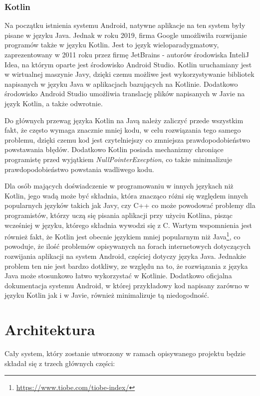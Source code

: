 \documentclass[a4paper,12pt,twoside,openany]{report}
\begin{document}
\subsection{Kotlin}
Na początku istnienia systemu Android, natywne aplikacje na ten system były pisane w języku Java. Jednak w roku 2019, firma Google umożliwiła rozwijanie programów także w języku Kotlin. Jest to język wieloparadygmatowy, zaprezentowany w 2011 roku przez firmę JetBrains - autorów środowiska InteliJ Idea, na którym oparte jest środowisko Android Studio. Kotlin uruchamiany jest w wirtualnej maszynie Javy, dzięki czemu możliwe jest wykorzystywanie bibliotek napisanych w języku Java w aplikacjach bazujących na Kotlinie. Dodatkowo środowisko Android Studio umożliwia translację plików napisanych w Javie na język Kotlin, a także odwrotnie. 

Do głównych przewag języka Kotlin na Javą należy zaliczyć przede wszystkim fakt, że często wymaga znacznie mniej kodu, w celu rozwiązania tego samego problemu, dzięki czemu kod jest czytelniejszy co zmniejsza prawdopodobieństwo powstawania błędów. Dodatkowo Kotlin posiada mechanizmy chroniące programistę przed wyjątkiem \textit{NullPointerExecption}, co także minimalizuje prawdopodobieństwo powstania wadliwego kodu. 

Dla osób mających doświadczenie w programowaniu w innych językach niż Kotlin, jego wadą może być składnia, która znacząco różni się względem innych popularnych języków takich jak Javy, czy C++ co może powodować problemy dla programistów, którzy uczą się pisania aplikacji przy użyciu  Kotlina, pisząc wcześniej w języku, którego składnia wywodzi się z C. Wartym wspomnienia jest również fakt, że Kotlin jest obecnie językiem mniej popularnym niż Java\footnote{\url{https://www.tiobe.com/tiobe-index/}}, co powoduje, że ilość problemów opisywanych na forach internetowych dotyczących rozwijania aplikacji na system Android, częściej dotyczy języka Java. Jednakże problem ten nie jest bardzo dotkliwy, ze względu na to, że rozwiązania z języka Java może stosunkowo łatwo wykorzystać w Kotlinie. Dodatkowo oficjalna dokumentacja systemu Android, w której przykładowy kod napisany zarówno w języku Kotlin jak i w Javie, również minimalizuje tą niedogodność. 

\chapter{Architektura}
Cały system, który zostanie utworzony w ramach opisywanego projektu będzie składał się z trzech głównych części: 
\end{document}
